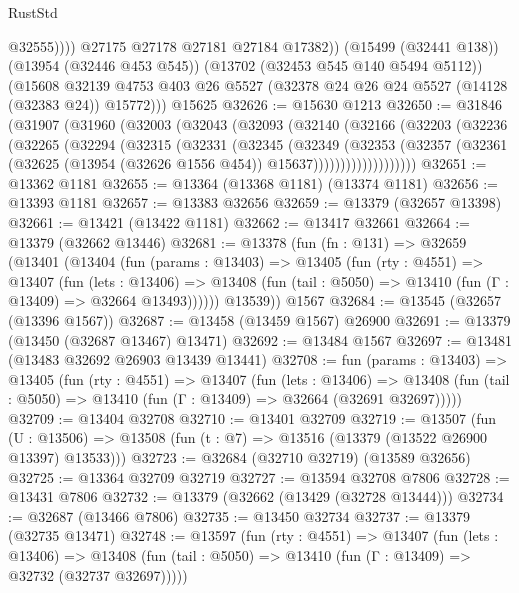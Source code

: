 \begin{lexlean}{RustStd}
\begin{coremodule}
                  @32555))))
          @27175
          @27178
          @27181
          @27184
          @17382))
      (@15499 (@32441 @138))
      (@13954 (@32446 @453 @545))
      (@13702 (@32453 @545 @140 @5494 @5112))
      (@15608 @32139 @4753 @403 @26 @5527 (@32378 @24 @26 @24 @5527 (@14128 (@32383 @24)) @15772)))
    @15625
@32626 := @15630 @1213
@32650 := @31846
    (@31907
      (@31960
        (@32003
          (@32043
            (@32093
              (@32140
                (@32166
                  (@32203
                    (@32236
                      (@32265
                        (@32294
                          (@32315
                            (@32331
                              (@32345
                                (@32349
                                  (@32353
                                    (@32357
                                      (@32361
                                        (@32625
                                          (@13954 (@32626 @1556 @454))
                                          @15637)))))))))))))))))))
@32651 := @13362 @1181
@32655 := @13364 (@13368 @1181) (@13374 @1181)
@32656 := @13393 @1181
@32657 := @13383 @32656
@32659 := @13379 (@32657 @13398)
@32661 := @13421 (@13422 @1181)
@32662 := @13417 @32661
@32664 := @13379 (@32662 @13446)
@32681 := @13378
    (fun (fn : @131) =>
    @32659
      (@13401
        (@13404
          (fun (params : @13403) =>
          @13405
            (fun (rty : @4551) =>
            @13407
              (fun (lets : @13406) =>
              @13408 (fun (tail : @5050) => @13410 (fun (Γ : @13409) => @32664 @13493))))))
        @13539))
    @1567
@32684 := @13545 (@32657 (@13396 @1567))
@32687 := @13458 (@13459 @1567) @26900
@32691 := @13379 (@13450 (@32687 @13467) @13471)
@32692 := @13484 @1567
@32697 := @13481 (@13483 @32692 @26903 @13439 @13441)
@32708 := fun (params : @13403) =>
  @13405
    (fun (rty : @4551) =>
    @13407
      (fun (lets : @13406) =>
      @13408 (fun (tail : @5050) => @13410 (fun (Γ : @13409) => @32664 (@32691 @32697)))))
@32709 := @13404 @32708
@32710 := @13401 @32709
@32719 := @13507
    (fun (U : @13506) => @13508 (fun (t : @7) => @13516 (@13379 (@13522 @26900 @13397) @13533)))
@32723 := @32684 (@32710 @32719) (@13589 @32656)
@32725 := @13364 @32709 @32719
@32727 := @13594 @32708 @7806
@32728 := @13431 @7806
@32732 := @13379 (@32662 (@13429 (@32728 @13444)))
@32734 := @32687 (@13466 @7806)
@32735 := @13450 @32734
@32737 := @13379 (@32735 @13471)
@32748 := @13597
    (fun (rty : @4551) =>
    @13407
      (fun (lets : @13406) =>
      @13408 (fun (tail : @5050) => @13410 (fun (Γ : @13409) => @32732 (@32737 @32697)))))

\end{coremodule}
\end{lexlean}
